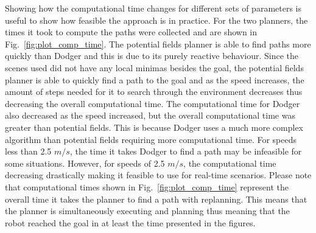 Showing how the computational time changes for different sets of parameters is
useful to show how feasible the approach is in practice. For the two planners,
the times it took to compute the paths were collected and are shown in
Fig.~\ref{fig:plot_comp_time}. The potential fields planner is able to find
paths more quickly than Dodger and this is due to its purely reactive
behaviour.  Since the scenes used did not have any local minimas besides the
goal, the potential fields planner is able to quickly find a path to the goal
and as the speed increases, the amount of steps needed for it to search through
the environment decreases thus decreasing the overall computational time.  The
computational time for Dodger also decreased as the speed increased, but the
overall computational time was greater than potential fields. This is because
Dodger uses a much more complex algorithm than potential fields requiring more
computational time. For speeds less than 2.5 $m/s$, the time it takes Dodger to
find a path may be infeasible for some situations.  However, for speeds of 2.5
$m/s$, the computational time decreasing drastically making it feasible to use
for real-time scenarios.  Please note that computational times shown in
Fig.~\ref{fig:plot_comp_time} represent the overall time it takes the planner
to find a path with replanning.  This means that the planner is simultaneously
executing and planning thus meaning that the robot reached the goal in at least
the time presented in the figures.

